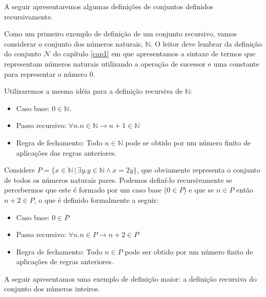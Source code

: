 A seguir apresentaremos algumas definições de conjuntos definidos
recursivamente.

\begin{Example}
Como um primeiro exemplo de definição de um conjunto recursivo, vamos
considerar o conjunto dos números naturais,
$\mathbb{N}$. O leitor deve lembrar da definição do conjunto
$\mathcal{N}$ do capítulo \ref{cap1} em que apresentamos a sintaxe de
termos que representam números naturais utilizando a operação de
sucessor e uma constante para representar o número $0$.

Utilizaremos a
mesma idéia para a definição recursiva de $\mathbb{N}$:
\begin{itemize}
  \item Caso base: $0\in\mathbb{N}$.
  \item Passo recursivo: $\forall n. n\in\mathbb{N}\to n + 1 \in
    \mathbb{N}$
  \item Regra de fechamento: Todo $n\in\mathbb{N}$ pode se obtido por
    um número finito de aplicações das regras anteriores.
\end{itemize}
\end{Example}

\begin{Example}
Considere  $P=\{x\in\mathbb{N}\,|\,\exists
y.y\in\mathbb{N}\land x = 2y\}$, que obviamente representa o conjunto
de todos os números naturais pares. Podemos definí-lo recursivamente
se percebermos que este é formado por um caso base ($0\in P$) e que se
$n\in P$ então $n + 2\in P$, o que é definido formalmente a seguir:
\begin{itemize}
  \item Caso base: $0\in P$
  \item Passo recursivo: $\forall n. n\in P \to n + 2 \in P$
  \item Regra de fechamento: Todo $n\in P$ pode ser obtido por um
    número finito de aplicações de regras anteriores.
\end{itemize}
\end{Example}

A seguir apresentamos uma exemplo de definição maior: a
definição recursiva do conjunto dos números inteiros.

